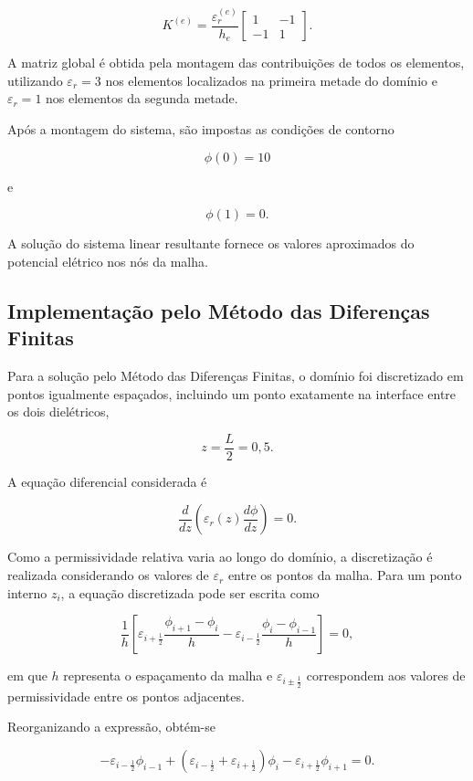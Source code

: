 \[
K^{(e)}
=
\frac{\varepsilon_r^{(e)}}{h_e}
\begin{bmatrix}
1 & -1 \\
-1 & 1
\end{bmatrix}.
\]

A matriz global é obtida pela montagem das contribuições de todos os elementos, utilizando \(\varepsilon_r=3\) nos elementos localizados na primeira metade do domínio e \(\varepsilon_r=1\) nos elementos da segunda metade.

Após a montagem do sistema, são impostas as condições de contorno

\[
\phi(0)=10
\]

e

\[
\phi(1)=0.
\]

A solução do sistema linear resultante fornece os valores aproximados do potencial elétrico nos nós da malha.

\subsection{Implementação pelo Método das Diferenças Finitas}

Para a solução pelo Método das Diferenças Finitas, o domínio foi discretizado em pontos igualmente espaçados, incluindo um ponto exatamente na interface entre os dois dielétricos,

\[
z=\frac{L}{2}=0{,}5.
\]

A equação diferencial considerada é

\[
\frac{d}{dz}
\left(
\varepsilon_r(z)
\frac{d\phi}{dz}
\right)
=0.
\]

Como a permissividade relativa varia ao longo do domínio, a discretização é realizada considerando os valores de \(\varepsilon_r\) entre os pontos da malha. Para um ponto interno \(z_i\), a equação discretizada pode ser escrita como

\[
\frac{1}{h}
\left[
\varepsilon_{i+\frac{1}{2}}
\frac{\phi_{i+1}-\phi_i}{h}
-
\varepsilon_{i-\frac{1}{2}}
\frac{\phi_i-\phi_{i-1}}{h}
\right]
=0,
\]

em que \(h\) representa o espaçamento da malha e
\(\varepsilon_{i\pm\frac{1}{2}}\) correspondem aos valores de permissividade entre os pontos adjacentes.

Reorganizando a expressão, obtém-se

\[
-\varepsilon_{i-\frac{1}{2}}\phi_{i-1}
+
\left(
\varepsilon_{i-\frac{1}{2}}
+
\varepsilon_{i+\frac{1}{2}}
\right)\phi_i
-
\varepsilon_{i+\frac{1}{2}}\phi_{i+1}
=0.
\]

